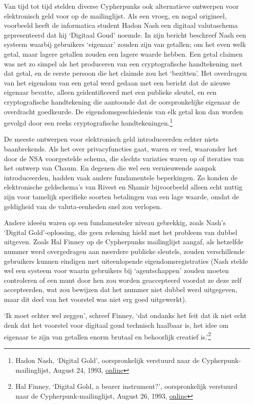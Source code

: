 \documentclass[smalldemyvopaper,11pt,twoside,onecolumn,openright,extrafontsizes,hidelinks]{memoir}
\begin{document}
Van tijd tot tijd stelden diverse Cypherpunks ook alternatieve ontwerpen
voor elektronisch geld voor op de mailinglijst. Als een vroeg, en nogal
origineel, voorbeeld heeft de informatica student Hadon Nash een
digitaal valutaschema gepresenteerd dat hij `Digitaal Goud' noemde. In
zijn bericht beschreef Nash een systeem waarbij gebruikers `eigenaar'
zouden zijn van getallen; om het even welk getal, maar lagere getallen
zouden een lagere waarde hebben. Een getal claimen was net zo simpel als
het produceren van een cryptografische handtekening met dat getal, en de
eerste persoon die het claimde zou het `bezitten'. Het overdragen van
het eigendom van een getal werd gedaan met een bericht dat de nieuwe
eigenaar bevatte, alleen geïdentificeerd met een publieke sleutel, en
een cryptografische handtekening die aantoonde dat de oorspronkelijke
eigenaar de overdracht goedkeurde. De eigendomsgeschiedenis van elk
getal kon dan worden gevolgd door een reeks cryptografische
handtekeningen.\footnote{Hadon Nash, `Digital Gold', oorspronkelijk
  verstuurd naar de Cypherpunk-mailinglijst, August 24, 1993,
  \href{https://cypherpunks.venona.com/date/1993/08/msg00698.html}{online}}

De meeste ontwerpen voor elektronisch geld introduceerden echter niets
baanbrekends. Als het over privacyfuncties gaat, waren er veel,
waaronder het door de NSA voorgestelde schema, die slechts variaties
waren op of iteraties van het ontwerp van Chaum. En degenen die wel een
vernieuwende aanpak introduceerden, hadden vaak andere fundamentele
beperkingen. Zo konden de elektronische geldschema's van Rivest en
Shamir bijvoorbeeld alleen echt nuttig zijn voor tamelijk specifieke
soorten betalingen van een lage waarde, omdat de geldigheid van de
valuta-eenheden snel zou verlopen.

Andere ideeën waren op een fundamenteler niveau gebrekkig, zoals Nash's
`Digital Gold'-oplossing, die geen rekening hield met het probleem van
dubbel uitgeven. Zoals Hal Finney op de Cypherpunks mailinglijst aangaf,
als hetzelfde nummer werd overgedragen aan meerdere publieke sleutels,
zouden verschillende gebruikers kunnen eindigen met uiteenlopende
eigendomsregistraties (Nash stelde wel een systeem voor waarin
gebruikers bij `agentschappen' zouden moeten controleren of een munt
door hen zou worden geaccepteerd voordat ze deze zelf accepteerden, wat
zou bewijzen dat het nummer niet dubbel werd uitgegeven, maar dit deel
van het voorstel was niet erg goed uitgewerkt).

`Ik moet echter wel zeggen', schreef Finney, `dat ondanks het feit dat
ik niet echt denk dat het voorstel voor digitaal goud technisch haalbaar
is, het idee om eigenaar te zijn van getallen enorm brutaal en
behoorlijk creatief is.'\footnote{Hal Finney, `Digital Gold, a bearer
  instrument?', oorspronkelijk verstuurd naar de
  Cypherpunk-mailinglijst, August 26, 1993,
  \href{https://cypherpunks.venona.com/date/1993/08/msg00788.html}{online}}
\end{document}
